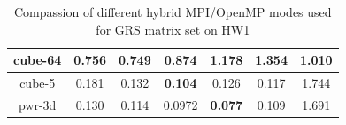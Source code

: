 \begin{table}[h!]
\begin{tabular}{|c|c|c|c|c|c|c|}
cube-64                                               & 0.756                                                     & \textbf{0.749}                                             & 0.874                                                     & 1.178                                                      & 1.354                                                      & 1.010                                                            \\ \hline
cube-5                                                & 0.181                                                     & 0.132                                                      & \textbf{0.104}                                            & 0.126                                                      & 0.117                                                      & 1.744                                                            \\ \hline
pwr-3d                                                & 0.130                                                     & 0.114                                                      & 0.0972                                                    & \textbf{0.077}                                             & 0.109                                                      & 1.691                                                            \\ \hline
\end{tabular}
\caption{Compassion of different hybrid MPI/OpenMP modes used for GRS matrix set on HW1}
\label{fig:mpi-omp-grs-hw1}
\end{table}



